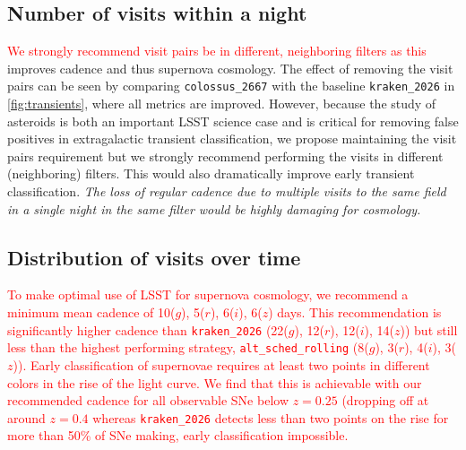 \documentclass[12pt, letterpaper]{article}
\newcommand{\review}[1]{{\textcolor{red}{#1}}}
\begin{document}
\subsection{Number of visits within a night}
\review{We strongly recommend visit pairs be in different, neighboring filters as this} improves cadence and thus supernova cosmology. The effect of removing the visit pairs can be seen by comparing \texttt{colossus\_2667} with the baseline \texttt{kraken\_2026} in \autoref{fig:transients}, where all metrics are improved. However, because the study of asteroids is both an important LSST science case and is critical for removing false positives in extragalactic transient classification, we propose maintaining the visit pairs requirement but we strongly recommend performing the visits in different (neighboring) filters. This would also dramatically improve early transient classification. \emph{The loss of regular cadence due to multiple visits to the same field in a single night in the same filter would be highly damaging for cosmology.} 

\subsection{Distribution of visits over time}
\label{sec:cadence}
\review{To make optimal use of LSST for supernova cosmology, we recommend a minimum mean cadence of 10($g$), 5($r$), 6($i$), 6($z$) days. This recommendation is significantly higher cadence than \texttt{kraken\_2026} (22($g$), 12($r$), 12($i$), 14($z$)) but still less than the highest performing strategy, \texttt{alt\_sched\_rolling} (8($g$), 3($r$), 4($i$), 3($z$)). Early classification of supernovae requires at least two points in different colors in the rise of the light curve. We find that this is achievable with our recommended cadence for all observable SNe below $z=0.25$ (dropping off at around $z=0.4$ whereas \texttt{kraken\_2026} detects less than two points on the rise for more than 50\% of SNe making, early classification impossible.} \\
\end{document}
